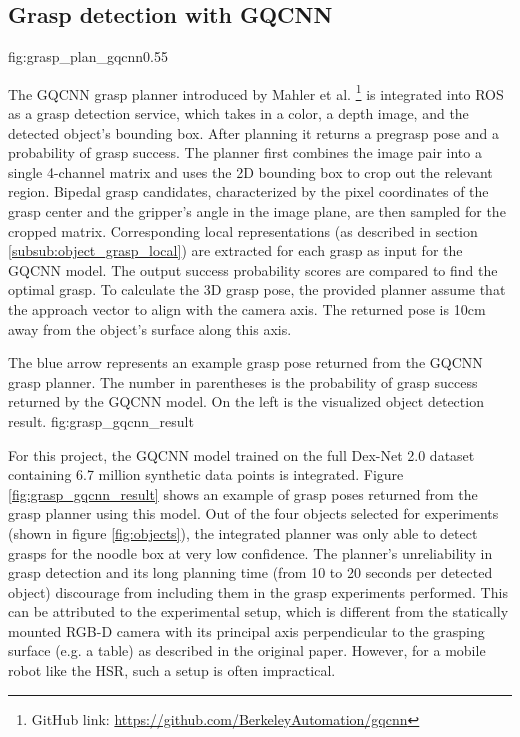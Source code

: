 \subsection{Grasp detection with GQCNN}

             {fig:grasp_plan_gqcnn}{0.55\textwidth}

The GQCNN grasp planner introduced by Mahler et al. \footnote{GitHub link:
\url{https://github.com/BerkeleyAutomation/gqcnn}} \cite{mahler2017} is integrated into ROS as a grasp detection
service, which takes in a color, a depth image, and the detected object's bounding box. After planning it returns a
pregrasp pose and a probability of grasp success. The planner first combines the image pair into a single 4-channel
matrix and uses the 2D bounding box to crop out the relevant region. Bipedal grasp candidates, characterized by the
pixel coordinates of the grasp center and the gripper's angle in the image plane, are then sampled for the cropped
matrix. Corresponding local representations (as described in section \ref{subsub:object_grasp_local}) are extracted for
each grasp as input for the GQCNN model. The output success probability scores are compared to find the optimal grasp.
To calculate the 3D grasp pose, the provided planner assume that the approach vector to align with the camera axis. The
returned pose is 10cm away from the object's surface along this axis.

             {The blue arrow represents an example grasp pose returned from the GQCNN grasp planner. The number
              in parentheses is the probability of grasp success returned by the GQCNN model. On the left is the
              visualized object detection result.}
             {fig:grasp_gqcnn_result}{\textwidth}

For this project, the GQCNN model trained on the full Dex-Net 2.0 dataset containing 6.7 million synthetic data points
\cite{mahler2017} is integrated. Figure \ref{fig:grasp_gqcnn_result} shows an example of grasp poses returned from the
grasp planner using this model. Out of the four objects selected for experiments (shown in figure \ref{fig:objects}),
the integrated planner was only able to detect grasps for the noodle box at very low confidence. The planner's
unreliability in grasp detection and its long planning time (from 10 to 20 seconds per detected object) discourage from
including them in the grasp experiments performed. This can be attributed to the experimental setup, which is different
from the statically mounted RGB-D camera with its principal axis perpendicular to the grasping surface (e.g. a table)
as
described in the original paper. However, for a mobile robot like the HSR, such a setup is often impractical.


